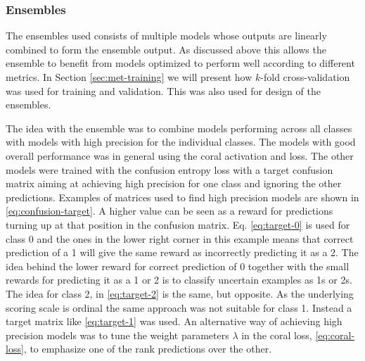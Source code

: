 \subsubsection{Ensembles}
The ensembles used consists of multiple models whose outputs are linearly combined to form the ensemble output. As discussed above this allows the ensemble to benefit from models optimized to perform well according to different metrics. In Section \ref{sec:met-training} we will present how $k$-fold cross-validation was used for training and validation. This was also used for design of the ensembles.

The idea with the ensemble was to combine models performing across all classes with models with high precision for the individual classes. The models with good overall performance was in general using the \gls{coral} activation and loss. The other models were trained with the confusion entropy loss with a target confusion matrix aiming at achieving high precision for one class and ignoring the other predictions. Examples of matrices used to find high precision models are shown in \eqref{eq:confusion-target}. A higher value can be seen as a reward for predictions turning up at that position in the confusion matrix. Eq. \eqref{eq:target-0} is used for class 0 and the ones in the lower right corner in this example means that correct prediction of a 1 will give the same reward as incorrectly predicting it as a 2.
The idea behind the lower reward for correct prediction of 0 together with the small rewards for predicting it as a 1 or 2 is to classify uncertain examples as 1s or 2s. The idea for class 2, in \eqref{eq:target-2} is the same, but opposite. As the underlying scoring scale is ordinal the same approach was not suitable for class 1. Instead a target matrix like \eqref{eq:target-1} was used. An alternative way of achieving high precision models was to tune the weight parameters $\lambda$ in the \gls{coral} loss, \eqref{eq:coral-loss}, to emphasize one of the rank predictions over the other.



